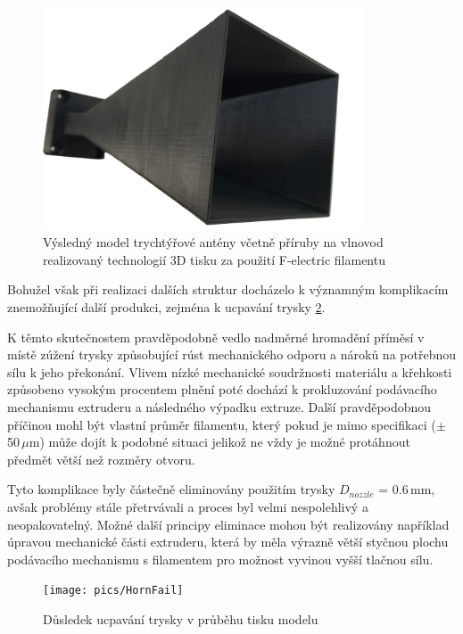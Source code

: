 \begin{figure}[!htbp]
\begin{center}
\includegraphics[width=9.5cm]{pics/HornReal}
\caption{Výsledný model trychtýřové antény včetně příruby na vlnovod realizovaný technologií 3D tisku za použití F-electric filamentu}
\label{fig:HornRealFe}
\end{center}
\end{figure}

Bohužel však při realizaci dalších struktur docházelo k významným komplikacím znemožňující další produkci, zejména k ucpavání trysky \ref{fig:HornFail}.

K těmto skutečnostem pravděpodobně vedlo nadměrné hromadění příměsí v místě zúžení trysky způsobující rúst mechanického odporu a nároků na potřebnou sílu k jeho překonání. Vlivem nízké mechanické soudržnosti materiálu a křehkosti způsobeno vysokým procentem plnění poté dochází k prokluzování podávacího mechanismu extruderu a následného výpadku extruze. Další pravděpodobnou příčinou mohl být vlastní průměr filamentu, který pokud je mimo specifikaci ($\pm$50\,$\mu$m) může dojít k podobné situaci jelikož ne vždy je možné protáhnout předmět větší než rozměry otvoru. 

Tyto komplikace byly částečně eliminovány použitím trysky $D_{nozzle}$ = 0.6\,mm, avšak problémy stále přetrvávali a proces byl velmi nespolehlivý a neopakovatelný. Možné další principy eliminace mohou být realizovány například úpravou mechanické části extruderu, která by měla výrazně větší styčnou plochu podávacího mechanismu s filamentem pro možnost vyvinou vyšší tlačnou sílu.

\begin{figure}[!htbp]
\begin{center}
\texttt{[image: pics/HornFail]}
\caption{Důsledek ucpavání trysky v průběhu tisku modelu}
\label{fig:HornFail}
\end{center}
\end{figure}


